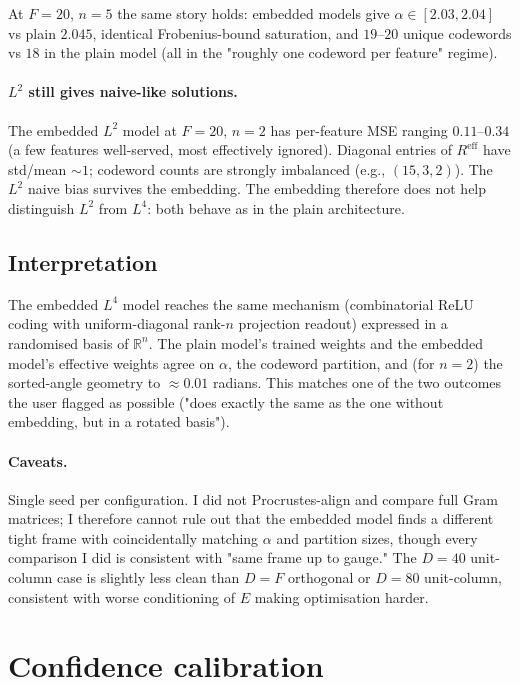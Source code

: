 \documentclass[11pt]{article}
\begin{document}
At $F=20$, $n=5$ the same story holds: embedded models give $\alpha \in
[2.03, 2.04]$ vs plain $2.045$, identical Frobenius-bound saturation, and
$19\text{--}20$ unique codewords vs $18$ in the plain model (all in the
"roughly one codeword per feature" regime).

\paragraph{$L^2$ still gives naive-like solutions.} The embedded $L^2$
model at $F=20,\,n=2$ has per-feature MSE ranging $0.11\text{--}0.34$ (a
few features well-served, most effectively ignored). Diagonal entries of
$R^{\mathrm{eff}}$ have std/mean $\sim 1$; codeword counts are strongly
imbalanced (e.g., $(15, 3, 2)$). The $L^2$ naive bias survives the
embedding. The embedding therefore does not help distinguish $L^2$ from
$L^4$: both behave as in the plain architecture.

\subsection{Interpretation}

The embedded $L^4$ model reaches the same mechanism (combinatorial ReLU
coding with uniform-diagonal rank-$n$ projection readout) expressed in a
randomised basis of $\mathbb{R}^n$. The plain model's trained weights and
the embedded model's effective weights agree on $\alpha$, the codeword
partition, and (for $n=2$) the sorted-angle geometry to $\approx 0.01$
radians. This matches one of the two outcomes the user flagged as possible
("does exactly the same as the one without embedding, but in a rotated
basis").

\paragraph{Caveats.} Single seed per configuration. I did not Procrustes-align
and compare full Gram matrices; I therefore cannot rule out that the
embedded model finds a different tight frame with coincidentally matching
$\alpha$ and partition sizes, though every comparison I did is consistent
with "same frame up to gauge." The $D = 40$ unit-column case is slightly
less clean than $D=F$ orthogonal or $D = 80$ unit-column, consistent with
worse conditioning of $E$ making optimisation harder.

\section{Confidence calibration}
\end{document}
